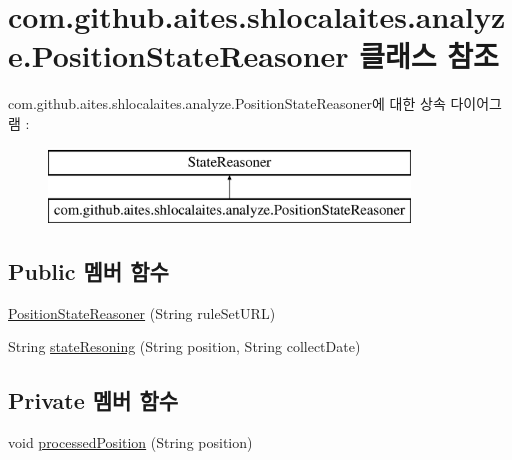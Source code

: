 \hypertarget{classcom_1_1github_1_1aites_1_1shlocalaites_1_1analyze_1_1_position_state_reasoner}{}\section{com.\+github.\+aites.\+shlocalaites.\+analyze.\+Position\+State\+Reasoner 클래스 참조}
\label{classcom_1_1github_1_1aites_1_1shlocalaites_1_1analyze_1_1_position_state_reasoner}
com.\+github.\+aites.\+shlocalaites.\+analyze.\+Position\+State\+Reasoner에 대한 상속 다이어그램 \+: \begin{figure}[H]
\begin{center}
\leavevmode
\includegraphics[height=2.000000cm]{classcom_1_1github_1_1aites_1_1shlocalaites_1_1analyze_1_1_position_state_reasoner}
\end{center}
\end{figure}
\subsection*{Public 멤버 함수}
\begin{DoxyCompactItemize}
\item 
\mbox{\hyperlink{classcom_1_1github_1_1aites_1_1shlocalaites_1_1analyze_1_1_position_state_reasoner_a210f277dd8aba8b696710c1d4164f18f}{Position\+State\+Reasoner}} (String rule\+Set\+U\+RL)
\item 
String \mbox{\hyperlink{classcom_1_1github_1_1aites_1_1shlocalaites_1_1analyze_1_1_position_state_reasoner_aa1ff3849b927ad2cd990e61aa3c365bb}{state\+Resoning}} (String position, String collect\+Date)
\end{DoxyCompactItemize}
\subsection*{Private 멤버 함수}
\begin{DoxyCompactItemize}
\item 
void \mbox{\hyperlink{classcom_1_1github_1_1aites_1_1shlocalaites_1_1analyze_1_1_position_state_reasoner_a2b79d5d0bf6a411556c17bf338d548ae}{processed\+Position}} (String position)
\end{DoxyCompactItemize}


